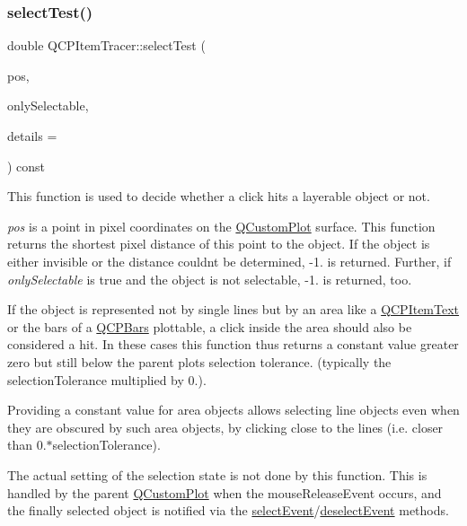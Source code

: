 \mbox{\label{class_q_c_p_item_tracer_a9fd955fea40e977d66f3a9fd5765aec4}} 
\subsubsection{\texorpdfstring{select\+Test()}{selectTest()}}
{\footnotesize\ttfamily double Q\+C\+P\+Item\+Tracer\+::select\+Test (\begin{DoxyParamCaption}\item[{const Q\+PointF \&}]{pos,  }\item[{bool}]{only\+Selectable,  }\item[{Q\+Variant $\ast$}]{details = {} }\end{DoxyParamCaption}) const\hspace{0.3cm}{\ttfamily [virtual]}}

This function is used to decide whether a click hits a layerable object or not.

{\itshape pos} is a point in pixel coordinates on the \hyperlink{class_q_custom_plot}{Q\+Custom\+Plot} surface. This function returns the shortest pixel distance of this point to the object. If the object is either invisible or the distance couldn\textquotesingle{}t be determined, -\/1. is returned. Further, if {\itshape only\+Selectable} is true and the object is not selectable, -\/1. is returned, too.

If the object is represented not by single lines but by an area like a \hyperlink{class_q_c_p_item_text}{Q\+C\+P\+Item\+Text} or the bars of a \hyperlink{class_q_c_p_bars}{Q\+C\+P\+Bars} plottable, a click inside the area should also be considered a hit. In these cases this function thus returns a constant value greater zero but still below the parent plot\textquotesingle{}s selection tolerance. (typically the selection\+Tolerance multiplied by 0.).

Providing a constant value for area objects allows selecting line objects even when they are obscured by such area objects, by clicking close to the lines (i.\+e. closer than 0.$\ast$selection\+Tolerance).

The actual setting of the selection state is not done by this function. This is handled by the parent \hyperlink{class_q_custom_plot}{Q\+Custom\+Plot} when the mouse\+Release\+Event occurs, and the finally selected object is notified via the \hyperlink{class_q_c_p_abstract_item_aa4b969c58797f39c9c0b6c07c7869d17}{select\+Event}/\hyperlink{class_q_c_p_abstract_item_af9093798cb07a861dcc73f93ca16c0c1}{deselect\+Event} methods.


